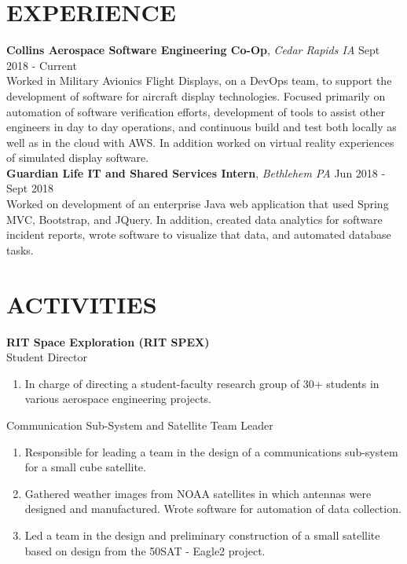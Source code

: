 \documentclass[line, resmargin]{res}
\begin{document}
\begin{resume}
\section{EXPERIENCE} 
\textbf{Collins Aerospace Software Engineering Co-Op}, \textit{Cedar Rapids IA} \hfill Sept 2018 - Current \\
Worked in Military Avionics Flight Displays, on a DevOps team, to support the development of software for aircraft display technologies.  Focused primarily on automation of software verification efforts, development of tools to assist other engineers in day to day operations, and continuous build and test both locally as well as in the cloud with AWS.  In addition worked on virtual reality experiences of simulated display software.\\ [10pt]
\textbf{Guardian Life IT and Shared Services Intern}, \textit{Bethlehem PA} \hfill Jun 2018 - Sept 2018 \\
Worked on development of an enterprise Java web application that used Spring MVC, Bootstrap, and JQuery.  In addition, created
data analytics for software incident reports, wrote software to visualize that data, and automated database tasks. \\
\vspace{-5.5mm}


\section{ACTIVITIES}
\textbf{RIT Space Exploration (RIT SPEX)}\\
Student Director
	\begin{enumerate}
		\item[]In charge of directing a student-faculty research group of 30+ students in various aerospace engineering projects. 
	\end{enumerate}
      
Communication Sub-System and  Satellite Team Leader
      \begin{enumerate}
        \item[] Responsible for leading a team in the design of a communications sub-system for a small cube satellite.
        \item[] Gathered weather images from NOAA satellites in which antennas were designed and manufactured. Wrote software for automation of data collection.
        \item[] Led a team in the design and preliminary construction of a small satellite based on design from the \textdollar 50SAT - Eagle2 project.
      \end{enumerate}
      

\end{resume}
\end{document}
